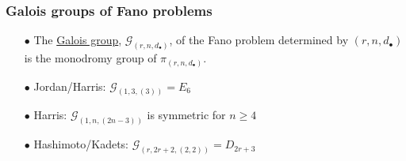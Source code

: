 \documentclass{beamer}
\theoremstyle{definition}
\newcommand{\blue}[1]{{\color{black!10!blue}\underline{#1}}}
\begin{document}
%
%
%
%
\begin{frame}
\frametitle{Galois groups of Fano problems}
\hspace{-.65cm}
\begin{minipage}{.73\textwidth}
\begin{enumerate}
\item[$\bullet$] The \blue{Galois group}, $\mathcal{G}_{(r,n,d_\bullet)}$, of the Fano problem determined by $(r,n,d_\bullet)$ is the monodromy group of $\pi_{(r,n,d_\bullet)}$.

\vspace{.1cm}

\item[$\bullet$] Jordan/Harris: $\mathcal{G}_{(1,3,(3))} = E_6$

\vspace{.1cm}

\item[$\bullet$] Harris: $\mathcal{G}_{(1,n,(2n-3))}$ is symmetric for $n\ge 4$

\vspace{.1cm}

\item[$\bullet$] Hashimoto/Kadets: $\mathcal{G}_{(r,2r+2,(2,2))} = D_{2r+3}$

\vspace{.1cm}


\end{enumerate}
\end{minipage}
\end{frame}
\end{document}

